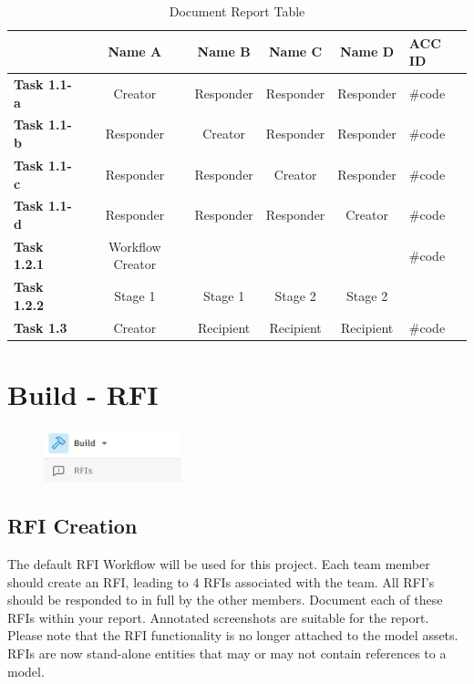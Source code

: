 \begin{table}[ht]
	\centering
	\begin{tabular}{|l|c|c|c|c|l|}
		\hline
		& \textbf{Name A} & \textbf{Name B} & \textbf{Name C} & \textbf{Name D} & \textbf{ACC ID}\\
		\hline
		\textbf{Task 1.1-a} & Creator & Responder & Responder & Responder & \#code\\
		\textbf{Task 1.1-b} & Responder & Creator & Responder & Responder & \#code\\
		\textbf{Task 1.1-c} & Responder & Responder & Creator & Responder & \#code\\
		\textbf{Task 1.1-d} & Responder & Responder & Responder & Creator & \#code\\
		\hline
		\textbf{Task 1.2.1} & Workflow Creator &  &  &  & \#code\\
		\textbf{Task 1.2.2} & Stage 1 & Stage 1 & Stage 2 & Stage 2 & \\
		\hline
		\textbf{Task 1.3} & Creator & Recipient & Recipient & Recipient & \#code\\
		\hline
	\end{tabular}
	\caption{Document Report Table }
	\label{tab:docs-items}
\end{table}





\newpage

\section{Build - RFI}

\begin{figure}[h!t]
	\includegraphics[width=4.0cm]{RevitAssets/rfi}
	\label{fig:projmgmt}
\end{figure}



\subsection{RFI Creation}
The default RFI Workflow will be used for this project.  Each team member should create an RFI, leading to 4 RFIs associated with the team.  All RFI's should be responded to in full by the other members.  Document each of these RFIs within your report. Annotated screenshots are suitable for the report.  Please note that the RFI functionality is no longer attached to the model assets.  RFIs are now stand-alone entities that may or may not contain references to a model.

